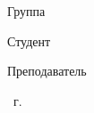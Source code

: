 \begin{titlepage}
\begin{center}
\begin{flushleft}
            \vspace{0.5cm}

            {Группа\,\, \uline{\mygroup \hfill}}

            \vspace{0.5cm}



            \vfill



            {Студент \hfill {} }

            \vspace{0.5cm}

            {Преподаватель \hfill {} }

            \vspace{0.5cm}

        \end{flushleft}

        \vfill

        \the\year\ г.

    \end{center}
\end{titlepage}

